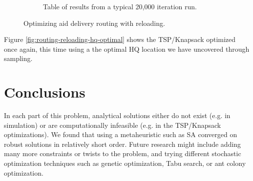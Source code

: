 \documentclass[a0,final]{a0poster}
\begin{document}
\begin{multicols}{3}
\begin{figure}[H]
\begin{subfigure}[b]{0.5\columnwidth}
	\vspace{1in}
    \caption{Table of results from a typical 20,000 iteration run.}
    \label{tab:results}
  \end{subfigure}
  \caption{Optimizing aid delivery routing with reloading.}
\end{figure}

\noindent Figure \ref{fig:routing-reloading-hq-optimal} shows the TSP/Knapsack optimized once again, this time using a the optimal HQ location we have uncovered through sampling.

\vspace{-6mm}

\section*{Conclusions}

\vspace{-6mm}

In each part of this problem, analytical solutions either do not exist (e.g. in simulation) or are computationally infeasible (e.g. in the TSP/Knapsack optimizations).  We found that using a metaheuristic such as SA converged on robust solutions in relatively short order.  Future research might include adding many more constraints or twists to the problem, and trying different stochastic optimization techniques such as genetic optimization, Tabu search, or ant colony optimization.

\vspace{-6mm}




\end{multicols}
\end{document}
